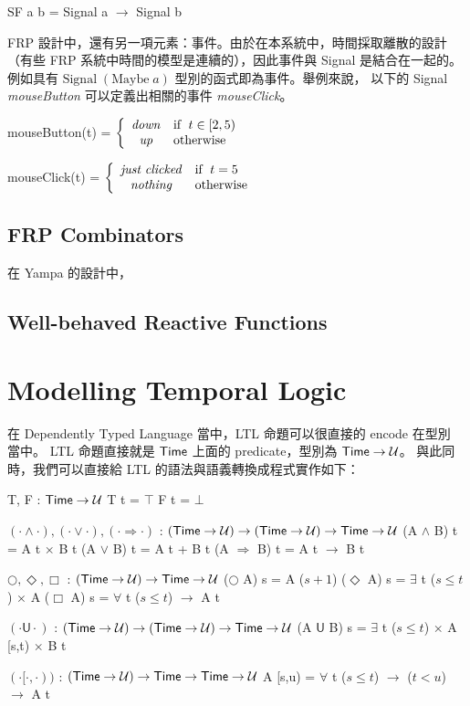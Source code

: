 \documentclass{article}
\newcommand{\U}{\mathcal{U}}
\begin{document}
  \begin{code}
  SF a b = Signal a $\to$ Signal b
  \end{code}

  FRP 設計中，還有另一項元素：事件。由於在本系統中，時間採取離散的設計
  （有些 FRP 系統中時間的模型是連續的），因此事件與 Signal 是結合在一起的。
  例如具有 $\text{Signal}\;(\text{Maybe}\;a)$ 型別的函式即為事件。舉例來說，
  以下的 Signal \textit{mouseButton} 可以定義出相關的事件
  \textit{mouseClick}。

  \begin{code}
  mouseButton(t) = $\displaystyle \left\{ \begin{array}{cl} \mathit{down} & \text{if\; } t\in [2,5) \\ \mathit{up} & \text{otherwise} \end{array} \right.$

  mouseClick(t) = $\displaystyle \left\{ \begin{array}{cl} \mathit{just\; clicked} & \text{if\; } t=5 \\ \mathit{nothing} & \text{otherwise} \end{array} \right.$
  \end{code}


  \subsection{FRP Combinators}

  在 Yampa 的設計中，

  \subsection{Well-behaved Reactive Functions}
\section{Modelling Temporal Logic}
  在 Dependently Typed Language 當中，LTL 命題可以很直接的 encode 在型別
  當中。 LTL 命題直接就是 $\mathsf{Time}$ 上面的 predicate，型別為 $\Time\to\U$。
  與此同時，我們可以直接給 LTL 的語法與語義轉換成程式實作如下：

  \begin{code}
  T, F : $\Time\to\U$
  T t = $\top$
  F t = $\bot$

  $(\cdot\land\cdot), (\cdot\lor\cdot), (\cdot\Rightarrow\cdot)$ : $(\Time\to\U)\to(\Time\to\U)\to\Time\to\U$
  (A $\land$ B) t = A t $\times$ B t
  (A $\lor$ B) t = A t + B t
  (A $\Rightarrow$ B) t = A t $\to$ B t

  $\bigcirc,\Diamond,\Box$ : $(\Time\to\U)\to\Time\to\U$
  ($\bigcirc$ A) s = A ($s+1$)
  ($\Diamond$ A) s = $\exists$ {t} ($s\le t$) $\times$ A 
  ($\Box$ A) s = $\forall$ {t} ($s\le t$) $\to$ A t

  $(\cdot\mathsf{U}\cdot)$ : $(\Time\to\U)\to(\Time\to\U)\to\Time\to\U$
  (A $\mathsf{U}$ B) s = $\exists$ {t} ($s\le t$) $\times$ A [s,t) $\times$ B t

  $(\cdot[\cdot,\cdot))$ : $(\Time\to\U)\to\Time\to\Time\to\U$
  A [s,u) = $\forall$ {t} ($s\le t$) $\to$ ($t<u$) $\to$ A t
  \end{code}
\end{document}
